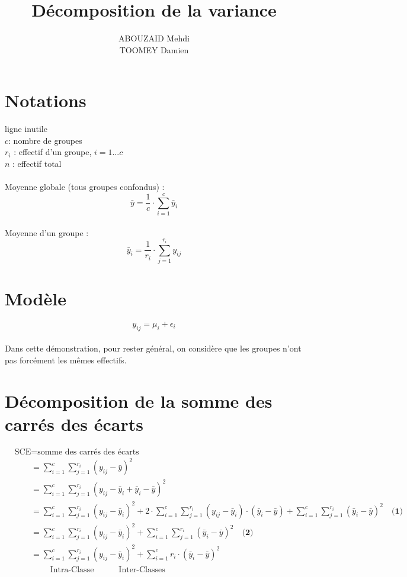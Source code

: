 \documentclass[a4paper,12pt]{article}
\title{Décomposition de la variance}
\date{}
\begin{document}
\maketitle

\vspace{10\baselineskip}
\begin{center}
	\author{ABOUZAID Mehdi \\ TOOMEY Damien}
\end{center}

\newpage
\tableofcontents

\newpage
\section{Notations}
\color{white} ligne inutile\\
\color{black} $ c $: nombre de groupes \\
$ r_i $ : effectif d'un groupe, $ i= 1...c$ \\
$ n $ : effectif total \\
\\ 
Moyenne globale (tous groupes confondus) :
\[ \bar{y}=\frac{1}{c} \cdot \sum_{i=1}^{c} \bar{y}_i\]
\\
Moyenne d'un groupe :
\[ \bar{y}_i=\frac{1}{r_i} \cdot \sum_{j=1}^{r_i} y_{ij} \]

\section{Modèle}
\[ y_{ij}=\mu_i + \epsilon_i \]
\\
Dans cette démonstration, pour rester général, on considère que les groupes n'ont pas forcément les mêmes effectifs.

\section{Décomposition de la somme des carrés des écarts}

\begin{align*}
& \text{SCE} = \text{somme des carrés des écarts} \\
& \;\;\;\;\;\;\; = \sum_{i=1}^{c} \sum_{j=1}^{r_i}  (y_{ij}-\bar{y})^2 \\
& \;\;\;\;\;\;\; = \sum_{i=1}^{c} \sum_{j=1}^{r_i}  (y_{ij}-\bar{y}_i+\bar{y}_i-\bar{y})^2 \\
& \;\;\;\;\;\;\; = \sum_{i=1}^{c} \sum_{j=1}^{r_i}  (y_{ij}-\bar{y}_i)^2 + 2 \cdot \sum_{i=1}^{c} \sum_{j=1}^{r_i} (y_{ij}-\bar{y}_i) \cdot (\bar{y}_i-\bar{y}) + \sum_{i=1}^{c} \sum_{j=1}^{r_i} (\bar{y}_i-\bar{y})^2 \quad \textbf{(1)}\\
& \;\;\;\;\;\;\; = \sum_{i=1}^{c} \sum_{j=1}^{r_i}  (y_{ij}-\bar{y}_i)^2 + \sum_{i=1}^{c} \sum_{j=1}^{r_i} (\bar{y}_i-\bar{y})^2 \quad \textbf{(2)} \\
& \;\;\;\;\;\;\; = \sum_{i=1}^{c} \sum_{j=1}^{r_i}  (y_{ij}-\bar{y}_i)^2 + \sum_{i=1}^{c} r_i \cdot (\bar{y}_i-\bar{y})^2 \\
& \qquad \qquad \; \text{Intra-Classe} \qquad \quad \text{Inter-Classes} \\
\end{align*}
\end{document}
